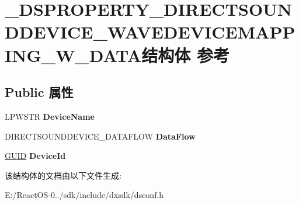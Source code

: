 \hypertarget{struct___d_s_p_r_o_p_e_r_t_y___d_i_r_e_c_t_s_o_u_n_d_d_e_v_i_c_e___w_a_v_e_d_e_v_i_c_e_m_a_p_p_i_n_g___w___d_a_t_a}{}\section{\+\_\+\+D\+S\+P\+R\+O\+P\+E\+R\+T\+Y\+\_\+\+D\+I\+R\+E\+C\+T\+S\+O\+U\+N\+D\+D\+E\+V\+I\+C\+E\+\_\+\+W\+A\+V\+E\+D\+E\+V\+I\+C\+E\+M\+A\+P\+P\+I\+N\+G\+\_\+\+W\+\_\+\+D\+A\+T\+A结构体 参考}
\label{struct___d_s_p_r_o_p_e_r_t_y___d_i_r_e_c_t_s_o_u_n_d_d_e_v_i_c_e___w_a_v_e_d_e_v_i_c_e_m_a_p_p_i_n_g___w___d_a_t_a}
\subsection*{Public 属性}
\begin{DoxyCompactItemize}
\item 
\mbox{\label{struct___d_s_p_r_o_p_e_r_t_y___d_i_r_e_c_t_s_o_u_n_d_d_e_v_i_c_e___w_a_v_e_d_e_v_i_c_e_m_a_p_p_i_n_g___w___d_a_t_a_a8bad11c9d925e27f75c3f1fadaea6196}} 
L\+P\+W\+S\+TR {\bfseries Device\+Name}
\item 
\mbox{\label{struct___d_s_p_r_o_p_e_r_t_y___d_i_r_e_c_t_s_o_u_n_d_d_e_v_i_c_e___w_a_v_e_d_e_v_i_c_e_m_a_p_p_i_n_g___w___d_a_t_a_a0a2bc955f32d963c614c364c5ab76f24}} 
D\+I\+R\+E\+C\+T\+S\+O\+U\+N\+D\+D\+E\+V\+I\+C\+E\+\_\+\+D\+A\+T\+A\+F\+L\+OW {\bfseries Data\+Flow}
\item 
\mbox{\label{struct___d_s_p_r_o_p_e_r_t_y___d_i_r_e_c_t_s_o_u_n_d_d_e_v_i_c_e___w_a_v_e_d_e_v_i_c_e_m_a_p_p_i_n_g___w___d_a_t_a_a156ddae3733e13c4a769a0dfc5b3d970}} 
\hyperlink{interface_g_u_i_d}{G\+U\+ID} {\bfseries Device\+Id}
\end{DoxyCompactItemize}


该结构体的文档由以下文件生成\+:\begin{DoxyCompactItemize}
\item 
E\+:/\+React\+O\+S-\/0../sdk/include/dxsdk/dsconf.\+h\end{DoxyCompactItemize}
